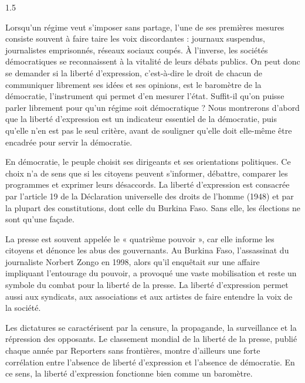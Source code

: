 \documentclass[12pt]{article}
\begin{document}
\begin{spacing}{1.5}


Lorsqu'un régime veut s'imposer sans partage, l'une de ses premières mesures consiste souvent à faire taire les voix discordantes : journaux suspendus, journalistes emprisonnés, réseaux sociaux coupés. À l'inverse, les sociétés démocratiques se reconnaissent à la vitalité de leurs débats publics. On peut donc se demander si la liberté d'expression, c'est-à-dire le droit de chacun de communiquer librement ses idées et ses opinions, est le baromètre de la démocratie, l'instrument qui permet d'en mesurer l'état. Suffit-il qu'on puisse parler librement pour qu'un régime soit démocratique ? Nous montrerons d'abord que la liberté d'expression est un indicateur essentiel de la démocratie, puis qu'elle n'en est pas le seul critère, avant de souligner qu'elle doit elle-même être encadrée pour servir la démocratie.


En démocratie, le peuple choisit ses dirigeants et ses orientations politiques. Ce choix n'a de sens que si les citoyens peuvent s'informer, débattre, comparer les programmes et exprimer leurs désaccords. La liberté d'expression est consacrée par l'article 19 de la Déclaration universelle des droits de l'homme (1948) et par la plupart des constitutions, dont celle du Burkina Faso. Sans elle, les élections ne sont qu'une façade.

La presse est souvent appelée le « quatrième pouvoir », car elle informe les citoyens et dénonce les abus des gouvernants. Au Burkina Faso, l'assassinat du journaliste Norbert Zongo en 1998, alors qu'il enquêtait sur une affaire impliquant l'entourage du pouvoir, a provoqué une vaste mobilisation et reste un symbole du combat pour la liberté de la presse. La liberté d'expression permet aussi aux syndicats, aux associations et aux artistes de faire entendre la voix de la société.

Les dictatures se caractérisent par la censure, la propagande, la surveillance et la répression des opposants. Le classement mondial de la liberté de la presse, publié chaque année par Reporters sans frontières, montre d'ailleurs une forte corrélation entre l'absence de liberté d'expression et l'absence de démocratie. En ce sens, la liberté d'expression fonctionne bien comme un baromètre.


\end{spacing}
\end{document}
